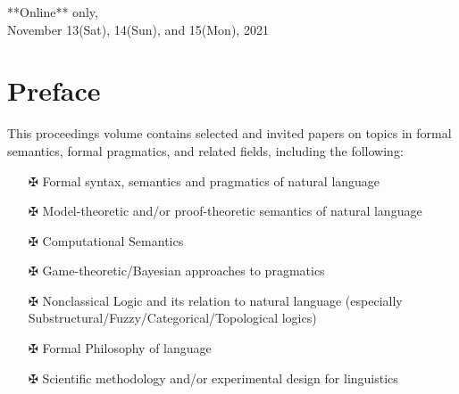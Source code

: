 \documentclass[12pt]{jarticle}
\begin{document}
\vspace*{1cm}
\begin{large}
\begin{center}
**Online** only, \\
November 13(Sat), 14(Sun), and 15(Mon), 2021
\end{center}
\end{large}
\vfill

\newpage

\vspace*{20cm}
\vfill
\begin{large}

\end{large}

\newpage
\pagestyle{plain}

\newpage
\section*{Preface}


This proceedings volume contains selected and invited papers on topics in formal semantics, formal pragmatics, and related fields, including the following:
\begin{itemize}
\item[$\maltese$] Formal syntax, semantics and pragmatics of natural language
\item[$\maltese$] Model-theoretic and/or proof-theoretic semantics of natural language
\item[$\maltese$] Computational Semantics
\item[$\maltese$] Game-theoretic/Bayesian approaches to pragmatics
\item[$\maltese$] Nonclassical Logic and its relation to natural language (especially Substructural/Fuzzy/Categorical/Topological logics)
\item[$\maltese$] Formal Philosophy of language
\item[$\maltese$] Scientific methodology and/or experimental design for linguistics
\end{itemize}



\vspace*{2.5cm}
\end{document}
